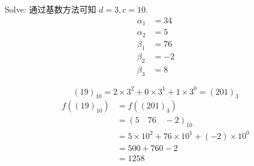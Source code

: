 Solve:
通过基数方法可知 $ d = 3, c = 10 $.
\begin{align*}
	\alpha_{1} &=  34  \\
	\alpha_{2} &=  5   \\
	\beta_{1}  &=  76  \\
	\beta_{2}  &= -2  \\
	\beta_{3}  &=  8  
\end{align*}

\begin{equation*}
	(19)_{10}   = 2 \times 3^2 + 0 \times 3^1 + 1 \times 3^0 = (201)_{3}
\end{equation*}
\begin{align*}
	f((19)_{10}) 
	&= f((201)_3) \\
	&= (5 \quad 76 \quad -2)_{10}\\
	&=5\times 10^2 + 76 \times 10^1 + (-2) \times 10^0\\
	&=500+760-2\\
	&=1258
\end{align*}


